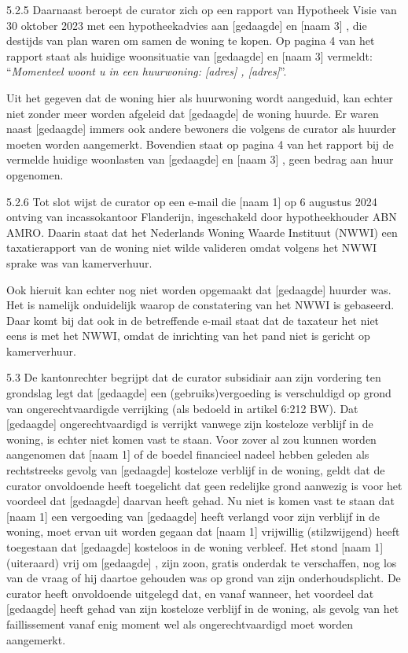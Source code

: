 \documentclass[
  dutch,
  a4paper,
]{article}
\begin{document}
5.2.5 Daarnaast beroept de curator zich op een rapport van Hypotheek Visie van 30 oktober 2023 met een hypotheekadvies aan {[}gedaagde{]} en {[}naam 3{]} , die destijds van plan waren om samen de woning te kopen. Op pagina 4 van het rapport staat als huidige woonsituatie van {[}gedaagde{]} en {[}naam 3{]} vermeldt: ``\emph{Momenteel woont u in een huurwoning: {[}adres{]} , {[}adres{]}}''.

Uit het gegeven dat de woning hier als huurwoning wordt aangeduid, kan echter niet zonder meer worden afgeleid dat {[}gedaagde{]} de woning huurde. Er waren naast {[}gedaagde{]} immers ook andere bewoners die volgens de curator als huurder moeten worden aangemerkt. Bovendien staat op pagina 4 van het rapport bij de vermelde huidige woonlasten van {[}gedaagde{]} en {[}naam 3{]} , geen bedrag aan huur opgenomen.

5.2.6 Tot slot wijst de curator op een e-mail die {[}naam 1{]} op 6 augustus 2024 ontving van incassokantoor Flanderijn, ingeschakeld door hypotheekhouder ABN AMRO. Daarin staat dat het Nederlands Woning Waarde Instituut (NWWI) een taxatierapport van de woning niet wilde valideren omdat volgens het NWWI sprake was van kamerverhuur.

Ook hieruit kan echter nog niet worden opgemaakt dat {[}gedaagde{]} huurder was. Het is namelijk onduidelijk waarop de constatering van het NWWI is gebaseerd. Daar komt bij dat ook in de betreffende e-mail staat dat de taxateur het niet eens is met het NWWI, omdat de inrichting van het pand niet is gericht op kamerverhuur.

5.3 De kantonrechter begrijpt dat de curator subsidiair aan zijn vordering ten grondslag legt dat {[}gedaagde{]} een (gebruiks)vergoeding is verschuldigd op grond van ongerechtvaardigde verrijking (als bedoeld in artikel 6:212 BW). Dat {[}gedaagde{]} ongerechtvaardigd is verrijkt vanwege zijn kosteloze verblijf in de woning, is echter niet komen vast te staan. Voor zover al zou kunnen worden aangenomen dat {[}naam 1{]} of de boedel financieel nadeel hebben geleden als rechtstreeks gevolg van {[}gedaagde{]} kosteloze verblijf in de woning, geldt dat de curator onvoldoende heeft toegelicht dat geen redelijke grond aanwezig is voor het voordeel dat {[}gedaagde{]} daarvan heeft gehad. Nu niet is komen vast te staan dat {[}naam 1{]} een vergoeding van {[}gedaagde{]} heeft verlangd voor zijn verblijf in de woning, moet ervan uit worden gegaan dat {[}naam 1{]} vrijwillig (stilzwijgend) heeft toegestaan dat {[}gedaagde{]} kosteloos in de woning verbleef. Het stond {[}naam 1{]} (uiteraard) vrij om {[}gedaagde{]} , zijn zoon, gratis onderdak te verschaffen, nog los van de vraag of hij daartoe gehouden was op grond van zijn onderhoudsplicht. De curator heeft onvoldoende uitgelegd dat, en vanaf wanneer, het voordeel dat {[}gedaagde{]} heeft gehad van zijn kosteloze verblijf in de woning, als gevolg van het faillissement vanaf enig moment wel als ongerechtvaardigd moet worden aangemerkt.
\end{document}
